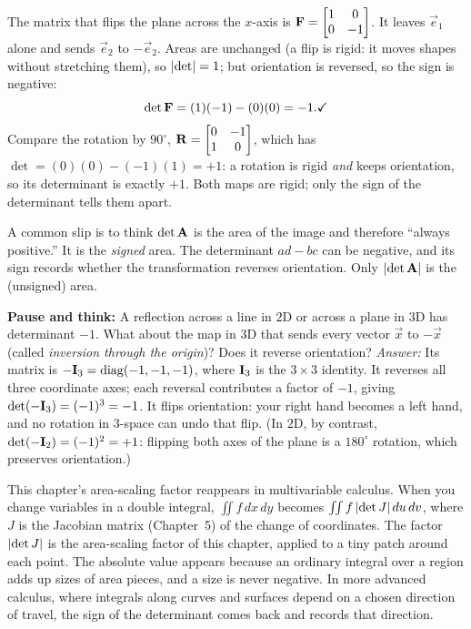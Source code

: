 \begin{example}
\label{ch21:ex-reflection}
The matrix that flips the plane across the $x$-axis is
$\mathbf{F} = \begin{bmatrix} 1 & 0 \\ 0 & -1 \end{bmatrix}$. It leaves $\vec e_1$
alone and sends $\vec e_2$ to $-\vec e_2$. Areas are unchanged (a flip is
rigid: it moves shapes without stretching them), so $\lvert\det\rvert = 1$; but orientation is reversed, so the sign is negative:
\[
  \det\mathbf{F} = (1)(-1) - (0)(0) = -1. \checkmark
\]
Compare the rotation by $90^\circ$, $\mathbf{R} = \begin{bmatrix} 0 & -1 \\ 1 & 0 \end{bmatrix}$,
which has $\det = (0)(0) - (-1)(1) = +1$: a rotation is rigid \emph{and} keeps
orientation, so its determinant is exactly $+1$. Both maps are rigid; only the
sign of the determinant tells them apart.
\end{example}

\begin{trapbox}
A common slip is to think $\det\mathbf{A}$ is the area of the image and therefore
``always positive.'' It is the \emph{signed} area. The determinant $ad-bc$ can be
negative, and its sign records whether the transformation reverses orientation. Only $\lvert\det\mathbf{A}\rvert$ is the (unsigned) area.
\end{trapbox}

\begin{recoverybox}
\textbf{Pause and think:} A reflection across a line in $2$D or across a plane in $3$D has determinant $-1$. What about the map in $3$D that sends every vector $\vec{x}$ to $-\vec{x}$ (called \emph{inversion through the origin})? Does it reverse orientation?
\emph{Answer:} Its matrix is $-\mathbf{I}_3 = \operatorname{diag}(-1,-1,-1)$, where $\mathbf{I}_3$ is the $3\times 3$ identity. It reverses all three coordinate axes; each reversal contributes a factor of $-1$, giving $\det(-\mathbf{I}_3) = (-1)^3 = -1$. It flips orientation: your right hand becomes a left hand, and no rotation in $3$-space can undo that flip. (In $2$D, by contrast, $\det(-\mathbf{I}_2) = (-1)^2 = +1$: flipping both axes of the plane is a $180^\circ$ rotation, which preserves orientation.)
\end{recoverybox}

\begin{connectionbox}
This chapter's area-scaling factor reappears in multivariable calculus. When you change
variables in a double integral, $\iint f\,dx\,dy$ becomes
$\iint f\,\lvert\det J\rvert\,du\,dv$, where $J$ is the Jacobian matrix (Chapter~5) of the change of
coordinates. The factor $\lvert\det J\rvert$ is the area-scaling factor of
this chapter, applied to a tiny patch around each point. The absolute value appears because an ordinary
integral over a region adds up sizes of area pieces, and a size is never negative.
In more advanced calculus, where integrals along curves and surfaces depend on
a chosen direction of travel, the sign of the determinant comes back and records that direction.
\end{connectionbox}

